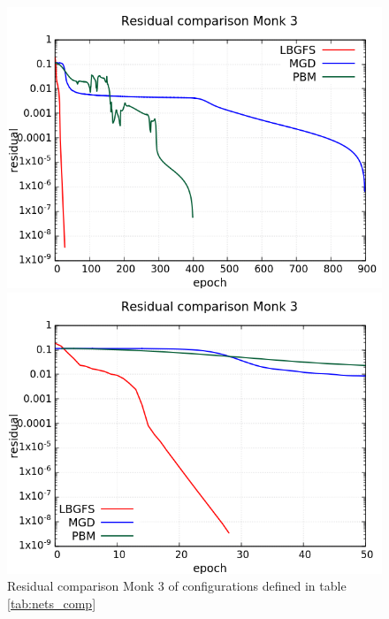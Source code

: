 \begin{figure}[H]
	\centering
	\begin{minipage}[t]{0.5\linewidth}
		\includegraphics[width=\linewidth]{data/Comparison/Monk3/Monk3_R_Comparison_log_standard.png}
	\end{minipage}%
	\begin{minipage}[t]{0.5\linewidth}
		\includegraphics[width=\linewidth]{data/Comparison/Monk3/Monk3_R_Comparison_log_zoom.png}
	\end{minipage}
	\caption{Residual comparison Monk 3 of configurations defined in table \ref{tab:nets_comp}}
	\label{R-Monk3}
\end{figure}